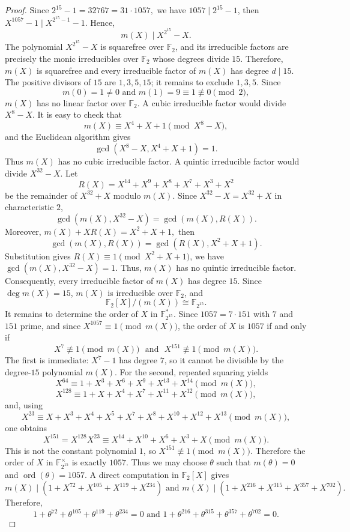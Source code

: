 \documentclass[10pt,a4paper]{amsart}
\begin{document}
\begin{proof}
Since
$
2^{15}-1=32767=31\cdot 1057,
$
we have \(1057\mid 2^{15}-1\), then \(X^{1057}-1\mid X^{2^{15}-1}-1\). Hence,
\[
m(X)\mid X^{2^{15}}-X.
\]
The polynomial \(X^{2^{15}}-X\) is squarefree over \(\mathbb F_2\), and its irreducible factors are precisely the monic irreducibles over \(\mathbb F_2\) whose degrees divide \(15\). Therefore, \(m(X)\) is squarefree and every irreducible factor of \(m(X)\) has degree \(d\mid 15\). The positive divisors of \(15\) are \(1,3,5,15\); it remains to exclude \(1,3,5\).
Since
\[
m(0)=1\neq 0\,\, \text{and}\,\, m(1)=9\equiv 1\not\equiv 0\pmod 2,
\]
\(m(X)\) has no linear factor over \(\mathbb F_2\).
A cubic irreducible factor would divide \(X^8-X\). It is easy to check that
\[
m(X)\equiv X^4+X+1\pmod{X^8-X},
\]
and the Euclidean algorithm gives
\[
\gcd(X^8-X,X^4+X+1)=1.
\]
Thus \(m(X)\) has no cubic irreducible factor.
A quintic irreducible factor would divide \(X^{32}-X\). Let
\[
R(X)=X^{14}+X^9+X^8+X^7+X^3+X^2
\]
be the remainder of \(X^{32}+X\) modulo \(m(X)\). Since \(X^{32}-X=X^{32}+X\) in characteristic \(2\),
\[
\gcd(m(X),X^{32}-X)=\gcd(m(X),R(X)).
\]
Moreover,
$
m(X)+XR(X)=X^2+X+1,
$
then
\[
\gcd(m(X),R(X))=\gcd(R(X),X^2+X+1).
\]
Substitution gives \(R(X)\equiv 1\pmod{X^2+X+1}\), we have
$
\gcd(m(X),X^{32}-X)=1.
$
Thus, \(m(X)\) has no quintic irreducible factor.
Consequently, every irreducible factor of \(m(X)\) has degree \(15\). Since \(\deg m(X)=15\), \(m(X)\) is irreducible over \(\mathbb F_2\), and
\[
\mathbb F_2[X]/(m(X))\cong \mathbb F_{2^{15}}.
\]
It remains to determine the order of \(X\) in \(\mathbb F_{2^{15}}^{*}\). Since \(1057=7\cdot 151\) with \(7\) and \(151\) prime, and since \(X^{1057}\equiv 1\pmod {m(X)}\), the order of \(X\) is \(1057\) if and only if
\[
X^7\not\equiv 1\pmod {m(X)}\,\,\,\, \text{and}\,\,\,\, X^{151}\not\equiv 1\pmod {m(X)}.
\]
The first is immediate: \(X^7-1\) has degree \(7\), so it cannot be divisible by the degree-\(15\) polynomial \(m(X)\).
For the second, repeated squaring yields
\[
X^{64}\equiv 1+X^3+X^6+X^9+X^{13}+X^{14}\pmod {m(X)},
\]
\[
X^{128}\equiv 1+X+X^4+X^7+X^{11}+X^{12}\pmod {m(X)},
\]
and, using
\[
X^{23}\equiv X+X^3+X^4+X^5+X^7+X^8+X^{10}+X^{12}+X^{13}\pmod {m(X)},
\]
one obtains
\[
X^{151}=X^{128}X^{23}\equiv X^{14}+X^{10}+X^6+X^3+X \pmod {m(X)}.
\]
This is not the constant polynomial \(1\), so \(X^{151}\not\equiv 1\pmod {m(X)}\). Therefore the order of \(X\) in \(\mathbb F_{2^{15}}^\times\) is exactly \(1057\).
Thus
we may choose \(\theta\) such that \(m(\theta)=0\) and
\(\operatorname{ord}(\theta)=1057\). A direct computation in
\(\mathbb F_2[X]\) gives
$$
m(X)\mid
\left(
1+X^{72}+X^{105}+X^{119}+X^{234}
\right)
\,\,\text{and}\,\,
m(X)\mid
\left(
1+X^{216}+X^{315}+X^{357}+X^{702}
\right).
$$
Therefore,
$$
1+\theta^{72}+\theta^{105}+\theta^{119}+\theta^{234}=0
\,\,\text{and}\,\,
1+\theta^{216}+\theta^{315}+\theta^{357}+\theta^{702}=0.
$$


\end{proof}
\end{document}
